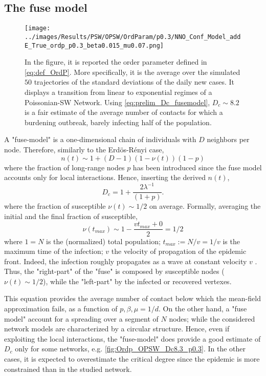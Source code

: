 \documentclass[a4paper,10pt,twoside]{book} %
\theoremstyle{definition}
\begin{document}
\subsection*{The fuse model}
\label{sec:simple_D_c_fuse_model}
\begin{figure}[t]
	\texttt{[image: ../images/Results/PSW/OPSW/OrdParam/p0.3/NNO\_Conf\_Model\_addE\_True\_ordp\_p0.3\_beta0.015\_mu0.07.png]}
	\centering
	\caption{In the figure, it is reported the order parameter defined in \autoref{eq:def_OrdP}. More specifically, it is the average over the simulated $50$ trajectories of the standard deviations of the daily new cases. It displays a transition from linear to exponential regimes of a Poissonian-SW Network. Using \autoref{eq:prelim_Dc_fusemodel}, $D_c \sim 8.2$ is a fair estimate of the average number of contacts for which a burdening outbreak, barely infecting half of the population.}
	\label{fig:SD_Threshold_Fuse_Model}
\end{figure}
A "fuse-model" is a one-dimensional chain of individuals with $D$ neighbors per node.
Therefore, similarly to the Erdös-Rényi case, 
\begin{equation}
	n(t) \sim 1+ (D-1)(1-\nu(t))(1-p)
	\label{eq:n(t)_fusemodel}
\end{equation}
where the fraction of long-range nodes $ p$ has been introduced since the fuse model accounts only for local interactions. 
Hence, inserting the derived $ n(t)$,
\begin{equation}
	D_c = 1 + \frac{2 \lambda^{-1}}{(1+p)}.
	\label{eq:simple_Dc_fusemodel}
\end{equation} 
where the fraction of susceptible $ \nu(t) \sim 1/2$ on average.  
Formally, averaging the initial and the final fraction of susceptible, 
\begin{equation}
	\nu(t_{max}) \sim 1-\frac{vt_{max}+0}{2} = 1/2
\end{equation}
where $1 = N$ is the (normalized) total population; $ t_{max}:= N/v = 1/v$ is the maximum time of the infection; $v$ the velocity of propagation of the epidemic front.  
Indeed, the infection roughly propagates as a wave at constant velocity $v$ . Thus, the "right-part" of the "fuse" is composed by susceptible nodes ($\nu(t) \sim 1/2$), while the "left-part" by the infected or recovered vertexes.

This equation provides the average number of contact below which the mean-field approximation fails, as a function of $p,\beta,\mu = 1/d$. On the other hand, a "fuse model" account for a spreading over a segment of $N$ nodes; while the considered network models are characterized by a circular structure. Hence, even if exploiting the local interactions, the "fuse-model" does provide a good estimate of $ D_c$ only for some networks, e.g. \autoref{fig:Ordp_OPSW_Dc8.3_p0.3}. In the other cases, it is expected to overestimate the critical degree since the epidemic is more constrained than in the studied network.
\end{document}
